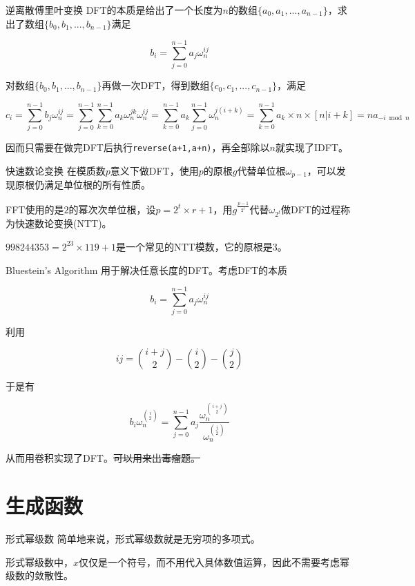 \documentclass{beamer}
\begin{document}
	\begin{frame}{逆离散傅里叶变换}
		DFT的本质是给出了一个长度为$n$的数组$\{a_0,a_1,...,a_{n-1}\}$，求出了数组$\{b_0,b_1,...,b_{n-1}\}$满足
		
		$$b_i=\sum_{j=0}^{n-1}a_j\omega_n^{ij}$$
		
		对数组$\{b_0,b_1,...,b_{n-1}\}$再做一次DFT，得到数组$\{c_0,c_1,...,c_{n-1}\}$，满足
		
		$$c_i=\sum_{j=0}^{n-1}b_j\omega_n^{ij}=\sum_{j=0}^{n-1}\sum_{k=0}^{n-1}a_k\omega_n^{jk}\omega_n^{ij}=\sum_{k=0}^{n-1}a_k\sum_{j=0}^{n-1}\omega_n^{j(i+k)}=\sum_{k=0}^{n-1}a_k\times n\times [n|i+k]=na_{-i \bmod n}$$
		
		因而只需要在做完DFT后执行\texttt{reverse(a+1,a+n)}，再全部除以$n$就实现了IDFT。
	\end{frame}
	\begin{frame}{快速数论变换}
		在模质数$p$意义下做DFT，使用$p$的原根$g$代替单位根$\omega_{p-1}$，可以发现原根仍满足单位根的所有性质。
		
		FFT使用的是$2$的幂次次单位根，设$p = 2^t \times r + 1$，用$g^{\frac{p-1}{2^t}}$代替$\omega_{2^t}$做DFT的过程称为快速数论变换(NTT)。
		
		$998244353=2^{23}\times 119 +1$是一个常见的NTT模数，它的原根是$3$。
	\end{frame}
	\begin{frame}{Bluestein's Algorithm}
		用于解决任意长度的DFT。考虑DFT的本质
		
		$$b_i=\sum_{j=0}^{n-1}a_j\omega_n^{ij}$$
		
		利用
		
		$$ij=\binom{i+j}{2}-\binom{i}{2}-\binom{j}{2}$$
		
		于是有
		
		$$b_i\omega_n^{\binom{i}{2}}=\sum_{j=0}^{n-1}a_j\frac{\omega_n^{\binom{i+j}{2}}}{\omega_n^{\binom{j}{2}}}$$
		
		从而用卷积实现了DFT。\sout{可以用来出毒瘤题。}
	\end{frame}
	\section{生成函数}
	\begin{frame}{形式幂级数}
		简单地来说，形式幂级数就是无穷项的多项式。
		
		形式幂级数中，$x$仅仅是一个符号，而不用代入具体数值运算，因此不需要考虑幂级数的敛散性。
	\end{frame}
\end{document}
